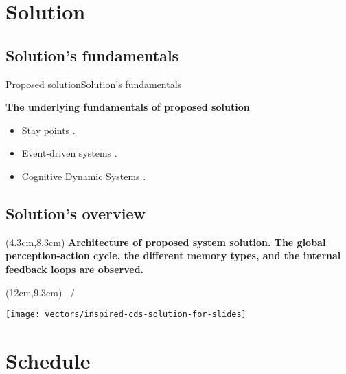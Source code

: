 \section{Solution}
\subsection{Solution's fundamentals}
\begin{frame}{Proposed solution}{Solution's fundamentals}
\small
\begin{block}{\small \textbf{The underlying fundamentals of proposed solution}}
\begin{itemize}
  \item Stay points \cite{Li2008}.
  \item Event-driven systems \cite{Faison2011}.
  \item Cognitive Dynamic Systems \cite{Haykin2014,Haykin2012a,Feng2017}.
\end{itemize}
\end{block}
\end{frame}



\subsection{Solution's overview}
{\aauwavesbg%
\begin{frame}[plain]
  \begin{textblock*}{8.5cm}(4.3cm,8.3cm)
  \small
  \textbf{Architecture of proposed system solution. The global perception-action cycle, the different memory types, and the internal feedback loops are observed.}
  \end{textblock*}

  \begin{textblock*}{1cm}(12cm,9.3cm)
  \scriptsize
  \insertframenumber~/~\inserttotalframenumber
  \end{textblock*}

  \centering
  \texttt{[image: vectors/inspired-cds-solution-for-slides]}
\end{frame}}

\section{Schedule}
